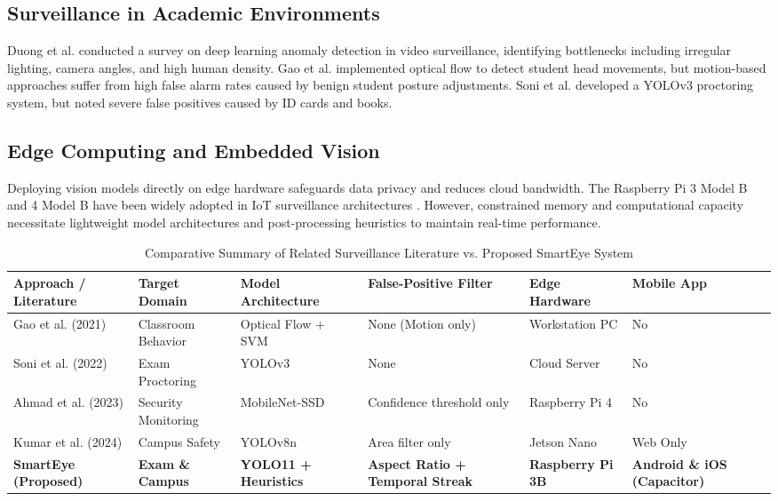 \documentclass[conference]{IEEEtran}
\begin{document}
\subsection{Surveillance in Academic Environments}
Duong et al. \cite{duong2022deep} conducted a survey on deep learning anomaly detection in video surveillance, identifying bottlenecks including irregular lighting, camera angles, and high human density. Gao et al. \cite{gao2021automated} implemented optical flow to detect student head movements, but motion-based approaches suffer from high false alarm rates caused by benign student posture adjustments. Soni et al. \cite{soni2022ai} developed a YOLOv3 proctoring system, but noted severe false positives caused by ID cards and books.

\subsection{Edge Computing and Embedded Vision}
Deploying vision models directly on edge hardware safeguards data privacy and reduces cloud bandwidth. The Raspberry Pi 3 Model B and 4 Model B have been widely adopted in IoT surveillance architectures \cite{ahmad2023edge, kumar2024low}. However, constrained memory and computational capacity necessitate lightweight model architectures and post-processing heuristics to maintain real-time performance.

\begin{table}[t]
\caption{Comparative Summary of Related Surveillance Literature vs. Proposed SmartEye System}
\label{tab:comparison}
\centering
\begin{tabular}{@{}llllll@{}}
\toprule
\textbf{Approach / Literature} & \textbf{Target Domain} & \textbf{Model Architecture} & \textbf{False-Positive Filter} & \textbf{Edge Hardware} & \textbf{Mobile App} \\ \midrule
Gao et al. (2021) \cite{gao2021automated} & Classroom Behavior & Optical Flow + SVM & None (Motion only) & Workstation PC & No \\
Soni et al. (2022) \cite{soni2022ai} & Exam Proctoring & YOLOv3 & None & Cloud Server & No \\
Ahmad et al. (2023) \cite{ahmad2023edge} & Security Monitoring & MobileNet-SSD & Confidence threshold only & Raspberry Pi 4 & No \\
Kumar et al. (2024) \cite{kumar2024low} & Campus Safety & YOLOv8n & Area filter only & Jetson Nano & Web Only \\
\textbf{SmartEye (Proposed)} & \textbf{Exam \& Campus} & \textbf{YOLO11 + Heuristics} & \textbf{Aspect Ratio + Temporal Streak} & \textbf{Raspberry Pi 3B} & \textbf{Android \& iOS (Capacitor)} \\ \bottomrule
\end{tabular}
\end{table}
\end{document}
